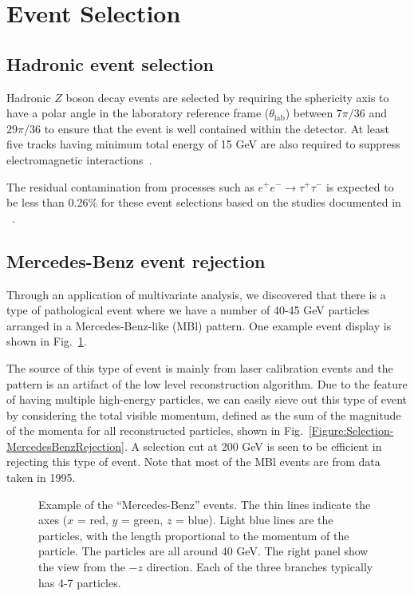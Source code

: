\section{Event Selection}\label{Section:Selection}

\subsection{Hadronic event selection}

Hadronic $Z$ boson decay events are selected by requiring the sphericity axis to have a polar angle in the laboratory reference frame ($\theta_{\text{lab}}$) between $7\pi/36$ and $29\pi/36$ to ensure that the event is well contained within the detector. At least five tracks having minimum total energy of 15 GeV are also required to suppress electromagnetic interactions~\cite{Barate:1996fi}. 

The residual contamination from processes such as $e^+e^-\rightarrow\tau^+\tau^-$ is expected to be less than 0.26\% for these event selections based on the studies documented in ~\cite{Barate:1996fi}.

\subsection{Mercedes-Benz event rejection}

Through an application of multivariate analysis, we discovered that there is a type of pathological event where we have a number of 40-45 GeV particles arranged in a Mercedes-Benz-like (MBl) pattern.  One example event display is shown in Fig.~\ref{Figure:Selection-MercedesBenz}.

The source of this type of event is mainly from laser calibration events and the pattern is an artifact of the low level reconstruction algorithm. Due to the feature of having multiple high-energy particles, we can easily sieve out this type of event by considering the total visible momentum, defined as the sum of the magnitude of the momenta for all reconstructed particles, shown in Fig.~\ref{Figure:Selection-MercedesBenzRejection}.  A selection cut at 200 GeV is seen to be efficient in rejecting this type of event.  Note that most of the MBl events are from data taken in 1995.

\begin{figure}[htp!]
    \centering
    \caption{Example of the ``Mercedes-Benz'' events.  The thin lines indicate the axes ($x$ = red, $y$ = green, $z$ = blue).  Light blue lines are the particles, with the length proportional to the momentum of the particle.  The particles are all around 40 GeV.  The right panel show the view from the $-z$ direction.  Each of the three branches typically has 4-7 particles.}
    \label{Figure:Selection-MercedesBenz}
\end{figure}

